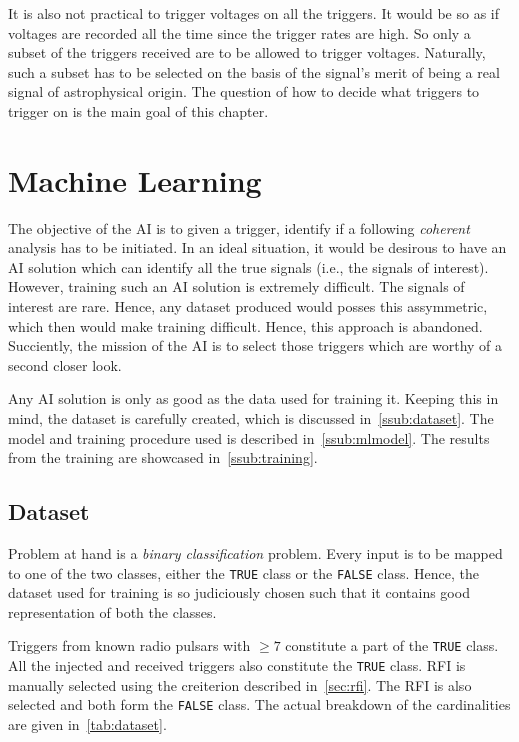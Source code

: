 \par It is also not practical to trigger voltages on all the triggers. It would be so as if voltages are recorded all the time since the trigger rates are high.
So only a subset of the triggers received are to be allowed to trigger voltages. 
Naturally, such a subset has to be selected on the basis of the signal's merit of being a real signal of astrophysical origin.
The question of how to decide what triggers to trigger on is the main goal of this chapter.

\section {Machine Learning}
\label{sec:ml}

\par The objective of the AI is to given a trigger, identify if a following \emph{coherent} analysis has to be initiated.
In an ideal situation, it would be desirous to have an AI solution which can identify all the true signals (i.e., the signals of interest).
However, training such an AI solution is extremely difficult.
The signals of interest are rare. Hence, any dataset produced would posses this assymmetric, which then would make training difficult.
Hence, this approach is abandoned. 
Succiently, the mission of the AI is to select those triggers which are worthy of a second closer look.

\par Any AI solution is only as good as the data used for training it. Keeping this in mind, the dataset is carefully created, which is discussed in~\autoref{ssub:dataset}. The model and training procedure used is described in~\autoref{ssub:mlmodel}.
The results from the training are showcased in~\autoref{ssub:training}.

\subsection{Dataset}

\label{ssub:dataset}

\par Problem at hand is a \emph{binary classification} problem. 
Every input is to be mapped to one of the two classes, either the \texttt{TRUE} class or the \texttt{FALSE} class.
Hence, the dataset used for training is so judiciously chosen such that it contains good representation of both the classes.

\par Triggers from known radio pulsars with \sn $\geq 7$ constitute a part of the \texttt{TRUE} class.
All the injected and received triggers also constitute the \texttt{TRUE} class.
RFI is manually selected using the creiterion described in~\autoref{sec:rfi}.
The  RFI is also selected and both form the \texttt{FALSE} class.
The actual breakdown of the cardinalities are given in~\autoref{tab:dataset}.

